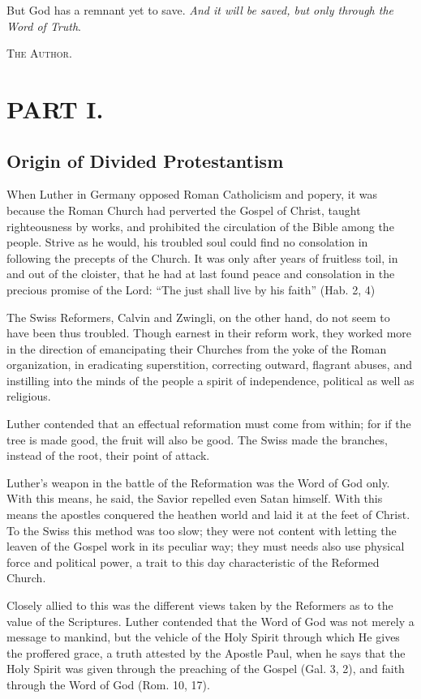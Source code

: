 \documentclass[
]{book}
\begin{document}
But God has a remnant yet to save. \emph{And it will be saved, but only through the Word of Truth}.

\textsc{The Author.}

\chapter*{PART I.}\label{part-i.}

\section{Origin of Divided Protestantism}\label{origin-of-divided-protestantism}

When Luther in Germany opposed Roman Catholicism and popery, it was because the Roman Church had perverted the Gospel of Christ, taught righteousness by works, and prohibited the circulation of the Bible among the people. Strive as he would, his troubled soul could find no consolation in following the precepts of the Church. It was only after years of fruitless toil, in and out of the cloister, that he had at last found peace and consolation in the precious promise of the Lord: ``The just shall live by his faith'' (Hab. 2, 4)

The Swiss Reformers, Calvin and Zwingli, on the other hand, do not seem to have been thus troubled. Though earnest in their reform work, they worked more in the direction of emancipating their Churches from the yoke of the Roman organization, in eradicating superstition, correcting outward, flagrant abuses, and instilling into the minds of the people a spirit of independence, political as well as religious.

Luther contended that an effectual reformation must come from within; for if the tree is made good, the fruit will also be good. The Swiss made the branches, instead of the root, their point of attack.

Luther's weapon in the battle of the Reformation was the Word of God only. With this means, he said, the Savior repelled even Satan himself. With this means the apostles conquered the heathen world and laid it at the feet of Christ. To the Swiss this method was too slow; they were not content with letting the leaven of the Gospel work in its peculiar way; they must needs also use physical force and political power, a trait to this day characteristic of the Reformed Church.

Closely allied to this was the different views taken by the Reformers as to the value of the Scriptures. Luther contended that the Word of God was not merely a message to mankind, but the vehicle of the Holy Spirit through which He gives the proffered grace, a truth attested by the Apostle Paul, when he says that the Holy Spirit was given through the preaching of the Gospel (Gal. 3, 2), and faith through the Word of God (Rom. 10, 17).
\end{document}
